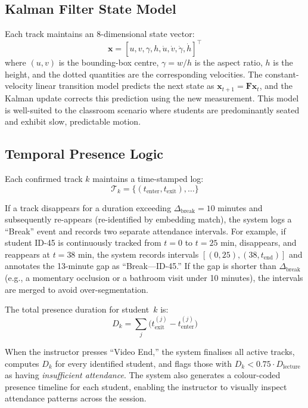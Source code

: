 \documentclass[conference, 10pt]{IEEEtran}
\begin{document}
\subsection{Kalman Filter State Model}

Each track maintains an 8-dimensional state vector:
\begin{equation}
    \mathbf{x} = [u, v, \gamma, h, \dot{u}, \dot{v}, \dot{\gamma}, \dot{h}]^\top
\end{equation}
where $(u, v)$ is the bounding-box centre, $\gamma = w / h$ is the aspect ratio, $h$ is the
height, and the dotted quantities are the corresponding velocities.  The constant-velocity
linear transition model predicts the next state as $\mathbf{x}_{t+1} = \mathbf{F}
\mathbf{x}_t$, and the Kalman update corrects this prediction using the new measurement.  This
model is well-suited to the classroom scenario where students are predominantly seated and
exhibit slow, predictable motion.

\subsection{Temporal Presence Logic}

Each confirmed track $k$ maintains a time-stamped log:
\begin{equation}
    \mathcal{T}_k = \bigl\{(t_{\text{enter}}, t_{\text{exit}}), \ldots \bigr\}
\end{equation}

If a track disappears for a duration exceeding $\Delta_{\text{break}} = 10$ minutes and
subsequently re-appears (re-identified by embedding match), the system logs a ``Break'' event
and records two separate attendance intervals.  For example, if student ID-45 is continuously
tracked from $t = 0$ to $t = 25$ min, disappears, and reappears at $t = 38$ min, the system
records intervals $[(0, 25), (38, t_{\text{end}})]$ and annotates the 13-minute gap as
``Break---ID-45.''  If the gap is shorter than $\Delta_{\text{break}}$ (e.g., a momentary
occlusion or a bathroom visit under 10 minutes), the intervals are merged to avoid
over-segmentation.

The total presence duration for student~$k$ is:
\begin{equation}
\label{eq:duration}
    D_k = \sum_{j} \bigl(t_{\text{exit}}^{(j)} - t_{\text{enter}}^{(j)}\bigr)
\end{equation}

When the instructor presses ``Video End,'' the system finalises all active tracks, computes
$D_k$ for every identified student, and flags those with $D_k < 0.75 \cdot D_{\text{lecture}}$
as having \emph{insufficient attendance}.  The system also generates a colour-coded presence
timeline for each student, enabling the instructor to visually inspect attendance patterns
across the session.
\end{document}

